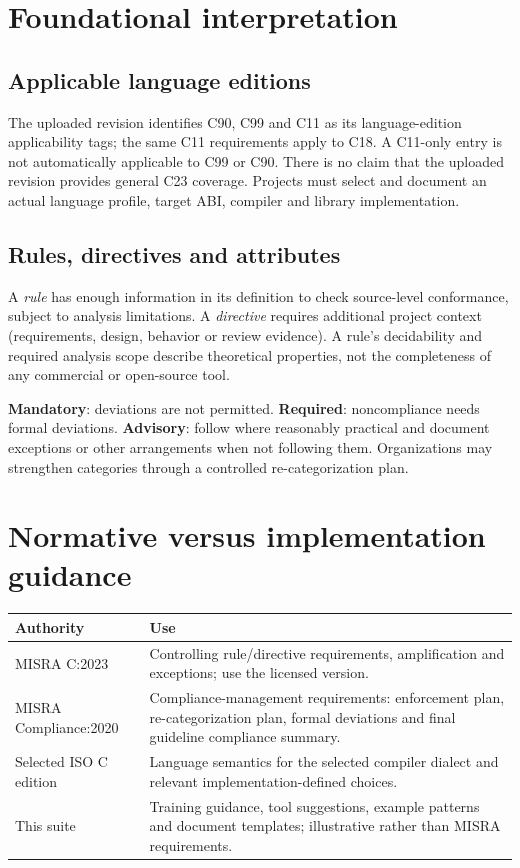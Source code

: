 \documentclass[10pt,letterpaper]{article}
\begin{document}
\section{Foundational interpretation}
\subsection{Applicable language editions}
The uploaded revision identifies C90, C99 and C11 as its language-edition applicability tags; the same C11 requirements apply to C18. A C11-only entry is not automatically applicable to C99 or C90. There is no claim that the uploaded revision provides general C23 coverage. Projects must select and document an actual language profile, target ABI, compiler and library implementation.
\subsection{Rules, directives and attributes}
A \emph{rule} has enough information in its definition to check source-level conformance, subject to analysis limitations. A \emph{directive} requires additional project context (requirements, design, behavior or review evidence). A rule's decidability and required analysis scope describe theoretical properties, not the completeness of any commercial or open-source tool.
\begin{keybox}\textbf{Mandatory}: deviations are not permitted. \textbf{Required}: noncompliance needs formal deviations. \textbf{Advisory}: follow where reasonably practical and document exceptions or other arrangements when not following them. Organizations may strengthen categories through a controlled re-categorization plan.\end{keybox}
\section{Normative versus implementation guidance}
\begin{tabularx}{\linewidth}{@{}p{.24\linewidth}X@{}}\toprule
\textbf{Authority} & \textbf{Use}\\\midrule
MISRA C:2023 & Controlling rule/directive requirements, amplification and exceptions; use the licensed version.\\
MISRA Compliance:2020 & Compliance-management requirements: enforcement plan, re-categorization plan, formal deviations and final guideline compliance summary.\\
Selected ISO C edition & Language semantics for the selected compiler dialect and relevant implementation-defined choices.\\
This suite & Training guidance, tool suggestions, example patterns and document templates; illustrative rather than MISRA requirements.\\\bottomrule\end{tabularx}
\end{document}
